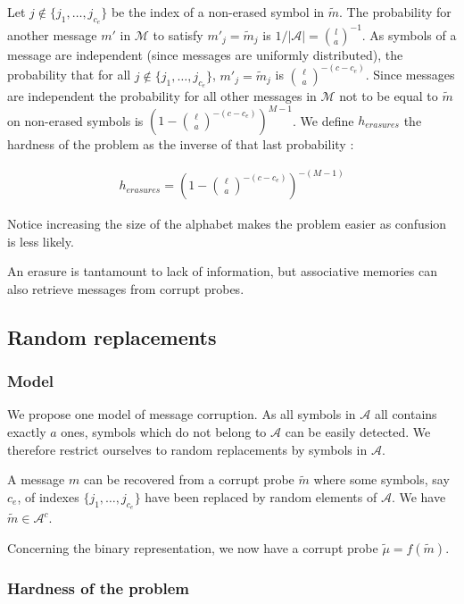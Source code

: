 \documentclass[english,10pt,twocolumn]{IEEEtran}
\theoremstyle{definition}
\begin{document}
	Let $j\not\in \{j_1, \dots , j_{c_e} \}$ be the index of a non-erased symbol in $\tilde{m}$. The probability for another message $m'$ in $\mathcal{M}$ to satisfy $m'_j = \tilde{m}_j$ is $1/|\mathcal{A}| = \binom{l}{a}^{-1}$. As symbols of a message are independent (since messages are uniformly distributed), the probability that for all $j\not\in \{j_1, \dots , j_{c_e} \}$, $m'_{j} = \tilde{m}_j$ is ${\ell \choose a}^{-(c - c_e)}$. Since messages are independent the probability for all other messages in $\mathcal{M}$ not to be equal to $\tilde{m}$ on non-erased symbols is $\left(1-{\ell \choose a}^{-(c - c_e)}\right)^{M-1}$. We define $h_{erasures}$ the hardness of the problem as the inverse of that last probability : 
	
	\begin{align}
		h_{erasures} = \left(1-{\ell \choose a}^{-(c - c_e)}\right)^{-(M-1)}
		\label{herrth}
	\end{align}
	
	Notice increasing the size of the alphabet makes the problem easier as confusion is less likely.

	An erasure is tantamount to lack of information, but associative memories can also retrieve messages from corrupt probes.
	
	\subsection{Random replacements}
	
	\subsubsection{Model}	
	We propose one model of message corruption. As all symbols in $\mathcal{A}$ all contains exactly $a$ ones, symbols which do not belong to $\mathcal{A}$ can be easily detected. We therefore restrict ourselves to random replacements by symbols in $\mathcal{A}$.
	
	A message $m$ can be recovered from a corrupt probe $\tilde{m}$ where some symbols, say $c_e$, of indexes $\{j_1, \dots , j_{c_e} \}$ have been replaced by random elements of $\mathcal{A}$. We have $\tilde{m} \in \mathcal{A}^c$.
	
	Concerning the binary representation, we now have a corrupt probe $\tilde{\mu} = f(\tilde{m})$.
	
	\subsubsection{Hardness of the problem}
		
\end{document}
